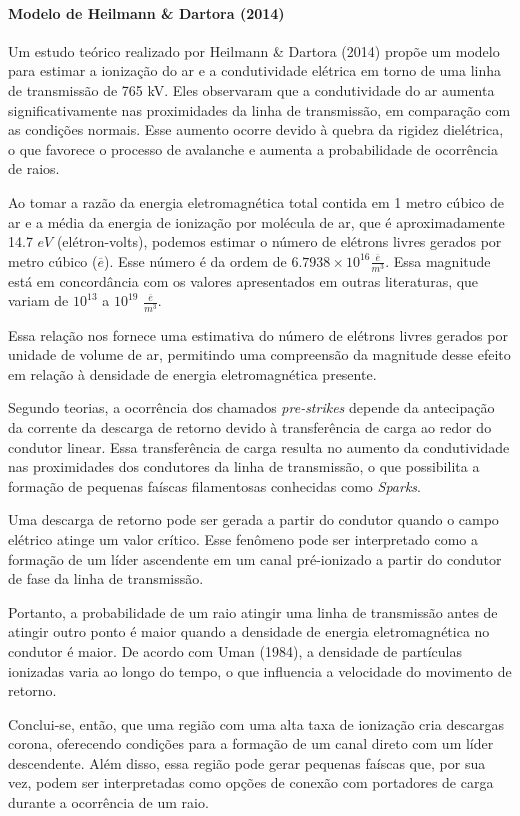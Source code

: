\documentclass[a4paper, 12pt, onecolumn,singlespacing]{article}
\begin{document}
	\paragraph{Modelo de Heilmann \& Dartora (2014)}
	
		Um estudo teórico realizado por Heilmann \& Dartora (2014) propõe um modelo para estimar a ionização do ar e a condutividade elétrica em torno de uma linha de transmissão de 765 kV. Eles observaram que a condutividade do ar aumenta significativamente nas proximidades da linha de transmissão, em comparação com as condições normais. Esse aumento ocorre devido à quebra da rigidez dielétrica, o que favorece o processo de avalanche e aumenta a probabilidade de ocorrência de raios.
		
		Ao tomar a razão da energia eletromagnética total contida em 1 metro cúbico de ar e a média da energia de ionização por molécula de ar, que é aproximadamente 14.7 $eV$ (elétron-volts), podemos estimar o número de elétrons livres gerados por metro cúbico ($\overline{e}$). Esse número é da ordem de $6.7938 \times 10^{16} \frac{\overline{e}}{m^3}$. Essa magnitude está em concordância com os valores apresentados em outras literaturas, que variam de $10^13$ a $10^19$ $\frac{\overline{e}}{m^3}$.
		
		Essa relação nos fornece uma estimativa do número de elétrons livres gerados por unidade de volume de ar, permitindo uma compreensão da magnitude desse efeito em relação à densidade de energia eletromagnética presente. 
		
		Segundo teorias, a ocorrência dos chamados \textit{pre-strikes} depende da antecipação da corrente da descarga de retorno devido à transferência de carga ao redor do condutor linear. Essa transferência de carga resulta no aumento da condutividade nas proximidades dos condutores da linha de transmissão, o que possibilita a formação de pequenas faíscas filamentosas conhecidas como \textit{Sparks}.
		
		Uma descarga de retorno pode ser gerada a partir do condutor quando o campo elétrico atinge um valor crítico. Esse fenômeno pode ser interpretado como a formação de um líder ascendente em um canal pré-ionizado a partir do condutor de fase da linha de transmissão.
		
		Portanto, a probabilidade de um raio atingir uma linha de transmissão antes de atingir outro ponto é maior quando a densidade de energia eletromagnética no condutor é maior. De acordo com Uman (1984), a densidade de partículas ionizadas varia ao longo do tempo, o que influencia a velocidade do movimento de retorno.
		
		Conclui-se, então, que uma região com uma alta taxa de ionização cria descargas corona, oferecendo condições para a formação de um canal direto com um líder descendente. Além disso, essa região pode gerar pequenas faíscas que, por sua vez, podem ser interpretadas como opções de conexão com portadores de carga durante a ocorrência de um raio.
	
\end{document}
